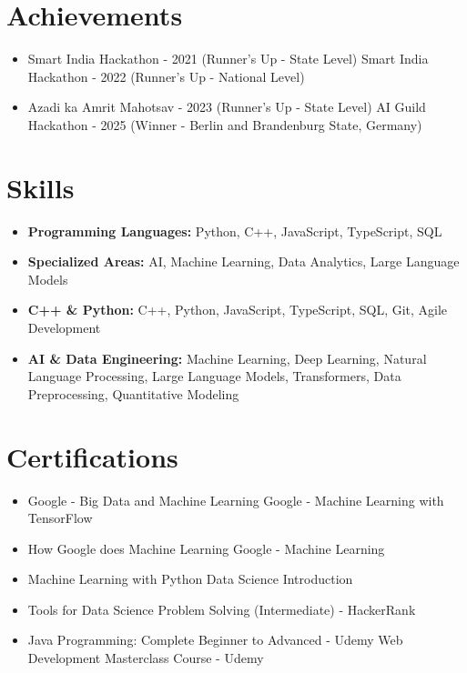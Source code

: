 \documentclass[a4paper,10pt]{article}
\begin{document}
\section*{Achievements}
\begin{itemize}
\item Smart India Hackathon - 2021 (Runner's Up - State Level) \hfill Smart India Hackathon - 2022 (Runner's Up - National Level)
\item Azadi ka Amrit Mahotsav - 2023 (Runner's Up - State Level) \hfill AI Guild Hackathon - 2025 (Winner - Berlin and Brandenburg State, Germany)
\end{itemize}

\section*{Skills}
\begin{itemize}
  \item \textbf{Programming Languages:} Python, C++, JavaScript, TypeScript, SQL
  \item \textbf{Specialized Areas:} AI, Machine Learning, Data Analytics, Large Language Models
  \item \textbf{C++ \& Python:} C++, Python, JavaScript, TypeScript, SQL, Git, Agile Development
  \item \textbf{AI \& Data Engineering:} Machine Learning, Deep Learning, Natural Language Processing, Large Language Models, Transformers, Data Preprocessing, Quantitative Modeling
\end{itemize}

\section*{Certifications}
\begin{itemize}
\item Google - Big Data and Machine Learning \hfill Google - Machine Learning with TensorFlow
\item How Google does Machine Learning \hfill Google - Machine Learning
\item Machine Learning with Python \hfill Data Science Introduction
\item Tools for Data Science \hfill Problem Solving (Intermediate) - HackerRank
\item Java Programming: Complete Beginner to Advanced - Udemy \hfill Web Development Masterclass Course - Udemy
\end{itemize}
\end{document}
